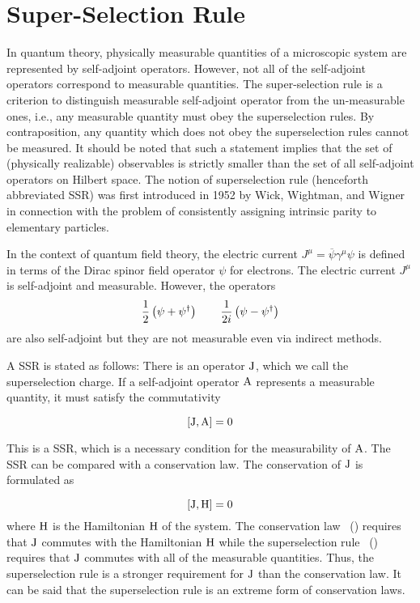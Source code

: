\chapter{Super-Selection Rule\label{appen:superselection}}


In quantum theory, physically measurable quantities of a microscopic system are represented by self-adjoint operators. However, not all of the self-adjoint operators correspond to measurable quantities. The super-selection rule is a criterion to distinguish measurable self-adjoint operator from the un-measurable ones, i.e., any measurable quantity must obey the superselection rules. By contraposition, any quantity which does not obey the superselection rules cannot be measured. It should be noted that
such a statement implies that the set of (physically realizable) observables is strictly
smaller than the set of all self-adjoint operators on Hilbert space. The notion of superselection rule (henceforth abbreviated SSR) was first introduced
in 1952 by Wick, Wightman, and Wigner~\cite{Wick:1952nb} in connection with the problem of consistently assigning intrinsic parity to elementary particles.


In the context of quantum field theory, the electric current \( J^\mu  = \overline{\psi}\gamma^\mu \psi\) is defined in terms of the Dirac spinor field operator \(\psi\) for electrons. The electric current $J^\mu$ is self-adjoint and measurable. However, the operators
\begin{equation}
	\frac{1}{2}\left(\psi + \psi ^\dagger \right) \qquad \frac{1}{2i}\left(\psi - \psi ^\dagger \right)
\end{equation}
are also self-adjoint but they are not measurable even via indirect methods.




A SSR is stated as follows: There is an operator ${\operatorname{J}}$, which we call the
superselection charge. If a self-adjoint operator ${\operatorname{A}}$ represents a measurable quantity, it must
satisfy the commutativity~\cite{TanimuraSuperSelection}

\begin{equation}
	\label{eq:superselection_law}
	\comm{\oper{J}}{\oper{A}} = 0
\end{equation}

This is a SSR, which is a necessary condition for the measurability of ${\operatorname{A}}$.
The SSR can be compared with a conservation law. The conservation of
${\operatorname{J}}$ is formulated as

\begin{equation}
	\label{eq:conservation_law}
	\comm{\oper{J}}{\oper{H}} = 0
\end{equation}
where ${\operatorname{H}}$ is the Hamiltonian ${\operatorname{H}}$ of the system. The conservation law ~() requires that
${\operatorname{J}}$ commutes with the Hamiltonian ${\operatorname{H}}$ while the superselection rule ~() requires that ${\operatorname{J}}$ commutes with all of the measurable quantities. Thus, the superselection rule is a stronger requirement for ${\operatorname{J}}$ than the conservation law. It can be said that the superselection rule is an extreme form of conservation laws.

